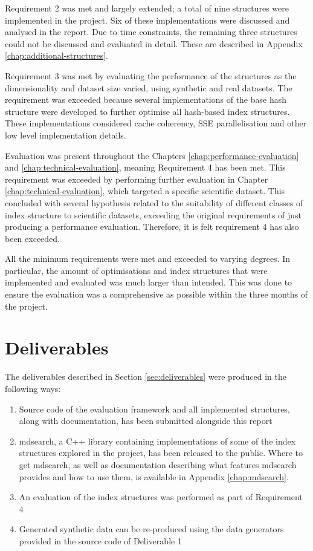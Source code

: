 Requirement 2 was met and largely extended; a total of nine structures were implemented in the project. Six of these implementations were discussed and analysed in the report. Due to time constraints, the remaining three structures could not be discussed and evaluated in detail. These are described in Appendix \ref{chap:additional-structures}. 

Requirement 3 was met by evaluating the performance of the structures as the dimensionality and dataset size varied, using synthetic and real datasets. The requirement was exceeded because several implementations of the base hash structure were developed to further optimise all hash-based index structures. These implementations considered cache coherency, SSE parallelisation and other low level implementation details. 

Evaluation was present throughout the Chapters \ref{chap:performance-evaluation} and \ref{chap:technical-evaluation}, meaning Requirement 4 has been met. This requirement was exceeded by performing further evaluation in Chapter \ref{chap:technical-evaluation}, which targeted a specific scientific dataset. This concluded with several hypothesis related to the suitability of different classes of index structure to scientific datasets, exceeding the original requirements of just producing a performance evaluation. Therefore, it is felt requirement 4 has also been exceeded.

All the minimum requirements were met and exceeded to varying degrees. In particular, the amount of optimisations and index structures that were implemented and evaluated was much larger than intended. This was done to ensure the evaluation was a comprehensive as possible within the three months of the project.

\newpage

\section{Deliverables}

The deliverables described in Section \ref{sec:deliverables} were produced in the following ways:
\begin{enumerate}
	\item Source code of the evaluation framework and all implemented structures, along with documentation, has been submitted alongside this report
	\item mdsearch, a C++ library containing implementations of some of the index structures explored in the project, has been released to the public. Where to get mdsearch, as well as documentation describing what features mdsearch provides and how to use them, is available in Appendix \ref{chap:mdsearch}.
	\item An evaluation of the index structures was performed as part of Requirement 4
	\item Generated synthetic data can be re-produced using the data generators provided in the source code of Deliverable 1
\end{enumerate}

